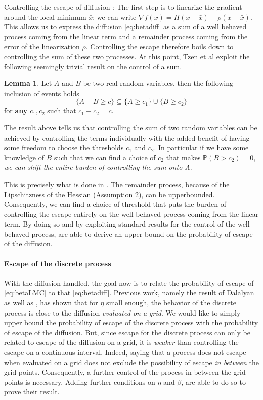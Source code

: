\documentclass[10pt,journal,a4paper]{IEEEtran}
\theoremstyle{definition}
\newtheorem{lemma}[theorem]{Lemma}
\newcommand{\Prb}{\mathbb{P}}
\begin{document}
\begin{paragraph}{Controlling the escape of diffusion :} The first step is to linearize the gradient around the local minimum $\bar{x}$: we can write $\nabla f(x) = H(x-\bar{x}) - \rho(x - \bar{x})$. This allows us to express the diffusion \eqref{eq:betadiff} as a sum of a well behaved process coming from the linear term and a remainder process coming from the error of the linearization $\rho$. Controlling the escape therefore boils down to controlling the sum of these two processes. At this point, Tzen et al exploit the following seemingly trivial result on the control of a sum.
\begin{lemma}
Let $A$ and $B$ be two real random variables, then the following inclusion of events holds 
\[
\{A + B \geq c \} \subseteq  \{A \geq c_1\} \cup \{ B \geq c_2\}
\]
for \textbf{any} $c_1, c_2$ such that $c_1 + c_2 = c$. 
\end{lemma}

The result above tells us that controlling the sum of two random variables can be achieved by controlling the terms individually with the added benefit of having some freedom to choose the thresholds $c_1$ and $c_2$. In particular if we have some knowledge of $B$ such that we can find a choice of $c_2$ that makes $\Prb(B > c_2) = 0$, \textit{we can shift the entire burden of controlling the sum onto A}.

This is precisely what is done in \cite{tzen_local_2018}. The remainder process, because of the Lipschitzness of the Hessian (Assumption 2), can be upperbounded. Consequently, we can find a choice of threshold that puts the burden of controlling the escape entirely on the well behaved process coming from the linear term. By doing so and by exploiting standard results for the control of the well behaved process, \cite{tzen_local_2018} are able to derive an upper bound on the probability of escape of the diffusion. 
\end{paragraph}

\paragraph{Escape of the discrete process} With the diffusion handled, the goal now is to relate the probability of escape of \eqref{eq:betaLMC} to that \eqref{eq:betadiff}. Previous work, namely the result of Dalalyan \cite{dalalyan_theoretical_2016} as well as \cite{raginsky_non-convex_2017}, has shown that for $\eta$ small enough, the behavior of the discrete process is close to the diffusion \textit{evaluated on a grid}. We would like to simply upper bound the probability of escape of the discrete process with the probability of escape of the diffusion. But, since escape for the discrete process can only be related to escape of the diffusion on a grid, it is \emph{weaker} than controlling the escape on a continuous interval. Indeed, saying that a process does not escape when evaluated on a grid does not exclude the possibility of escape \emph{in between} the grid points. Consequently, a further control of the process in between the grid points is necessary. Adding further conditions on $\eta$ and $\beta$, \cite{tzen_local_2018} are able to do so to prove their result.
\end{document}
